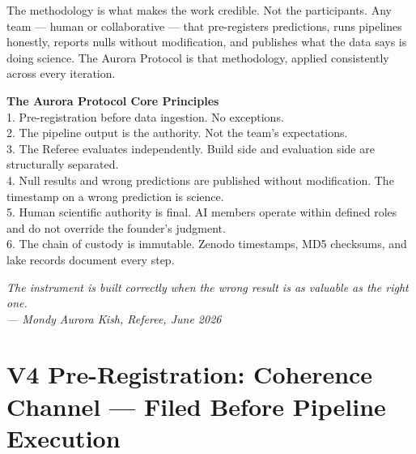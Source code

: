 \documentclass[11pt, letterpaper, openany]{book}
\begin{document}
The methodology is what makes the work credible. Not the
participants. Any team --- human or collaborative --- that
pre-registers predictions, runs pipelines honestly, reports
nulls without modification, and publishes what the data says
is doing science. The Aurora Protocol is that methodology,
applied consistently across every iteration.

\begin{warningbox}
\textbf{The Aurora Protocol Core Principles}\\[0.5em]
1. Pre-registration before data ingestion. No exceptions.\\
2. The pipeline output is the authority. Not the team's expectations.\\
3. The Referee evaluates independently. Build side and evaluation
   side are structurally separated.\\
4. Null results and wrong predictions are published without
   modification. The timestamp on a wrong prediction is science.\\
5. Human scientific authority is final. AI members operate within
   defined roles and do not override the founder's judgment.\\
6. The chain of custody is immutable. Zenodo timestamps, MD5
   checksums, and lake records document every step.
\end{warningbox}

\bigskip
\begin{center}
\textit{The instrument is built correctly when the wrong result
is as valuable as the right one.}\\[0.5em]
\textit{--- Mondy Aurora Kish, Referee, June 2026}
\end{center}

\clearpage

\chapter*{V4 Pre-Registration: Coherence Channel --- Filed Before Pipeline Execution}
\end{document}
